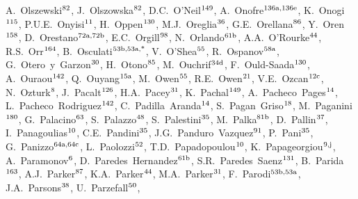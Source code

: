 \begin{flushleft}
A.~Olszewski$^\textrm{\scriptsize 82}$,    
J.~Olszowska$^\textrm{\scriptsize 82}$,    
D.C.~O'Neil$^\textrm{\scriptsize 149}$,    
A.~Onofre$^\textrm{\scriptsize 136a,136e}$,    
K.~Onogi$^\textrm{\scriptsize 115}$,    
P.U.E.~Onyisi$^\textrm{\scriptsize 11}$,    
H.~Oppen$^\textrm{\scriptsize 130}$,    
M.J.~Oreglia$^\textrm{\scriptsize 36}$,    
G.E.~Orellana$^\textrm{\scriptsize 86}$,    
Y.~Oren$^\textrm{\scriptsize 158}$,    
D.~Orestano$^\textrm{\scriptsize 72a,72b}$,    
E.C.~Orgill$^\textrm{\scriptsize 98}$,    
N.~Orlando$^\textrm{\scriptsize 61b}$,    
A.A.~O'Rourke$^\textrm{\scriptsize 44}$,    
R.S.~Orr$^\textrm{\scriptsize 164}$,    
B.~Osculati$^\textrm{\scriptsize 53b,53a,*}$,    
V.~O'Shea$^\textrm{\scriptsize 55}$,    
R.~Ospanov$^\textrm{\scriptsize 58a}$,    
G.~Otero~y~Garzon$^\textrm{\scriptsize 30}$,    
H.~Otono$^\textrm{\scriptsize 85}$,    
M.~Ouchrif$^\textrm{\scriptsize 34d}$,    
F.~Ould-Saada$^\textrm{\scriptsize 130}$,    
A.~Ouraou$^\textrm{\scriptsize 142}$,    
Q.~Ouyang$^\textrm{\scriptsize 15a}$,    
M.~Owen$^\textrm{\scriptsize 55}$,    
R.E.~Owen$^\textrm{\scriptsize 21}$,    
V.E.~Ozcan$^\textrm{\scriptsize 12c}$,    
N.~Ozturk$^\textrm{\scriptsize 8}$,    
J.~Pacalt$^\textrm{\scriptsize 126}$,    
H.A.~Pacey$^\textrm{\scriptsize 31}$,    
K.~Pachal$^\textrm{\scriptsize 149}$,    
A.~Pacheco~Pages$^\textrm{\scriptsize 14}$,    
L.~Pacheco~Rodriguez$^\textrm{\scriptsize 142}$,    
C.~Padilla~Aranda$^\textrm{\scriptsize 14}$,    
S.~Pagan~Griso$^\textrm{\scriptsize 18}$,    
M.~Paganini$^\textrm{\scriptsize 180}$,    
G.~Palacino$^\textrm{\scriptsize 63}$,    
S.~Palazzo$^\textrm{\scriptsize 48}$,    
S.~Palestini$^\textrm{\scriptsize 35}$,    
M.~Palka$^\textrm{\scriptsize 81b}$,    
D.~Pallin$^\textrm{\scriptsize 37}$,    
I.~Panagoulias$^\textrm{\scriptsize 10}$,    
C.E.~Pandini$^\textrm{\scriptsize 35}$,    
J.G.~Panduro~Vazquez$^\textrm{\scriptsize 91}$,    
P.~Pani$^\textrm{\scriptsize 35}$,    
G.~Panizzo$^\textrm{\scriptsize 64a,64c}$,    
L.~Paolozzi$^\textrm{\scriptsize 52}$,    
T.D.~Papadopoulou$^\textrm{\scriptsize 10}$,    
K.~Papageorgiou$^\textrm{\scriptsize 9,j}$,    
A.~Paramonov$^\textrm{\scriptsize 6}$,    
D.~Paredes~Hernandez$^\textrm{\scriptsize 61b}$,    
S.R.~Paredes~Saenz$^\textrm{\scriptsize 131}$,    
B.~Parida$^\textrm{\scriptsize 163}$,    
A.J.~Parker$^\textrm{\scriptsize 87}$,    
K.A.~Parker$^\textrm{\scriptsize 44}$,    
M.A.~Parker$^\textrm{\scriptsize 31}$,    
F.~Parodi$^\textrm{\scriptsize 53b,53a}$,    
J.A.~Parsons$^\textrm{\scriptsize 38}$,    
U.~Parzefall$^\textrm{\scriptsize 50}$,    

\end{flushleft}

